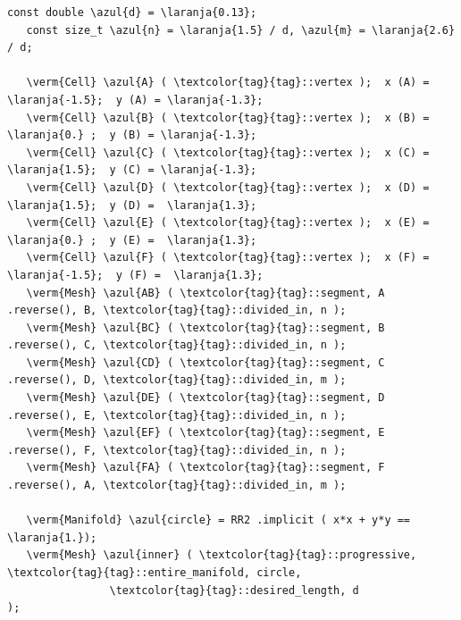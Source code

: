 \begin{Verbatim}[commandchars=\\\{\},formatcom=\small\tt,frame=single,
   label=parag-\ref{\numb section 7.\numb parag 22}.cpp,rulecolor=\color{moldura},
   baselinestretch=0.94,framesep=2mm                                             ]
   const double \azul{d} = \laranja{0.13};
   const size_t \azul{n} = \laranja{1.5} / d, \azul{m} = \laranja{2.6} / d;

   \verm{Cell} \azul{A} ( \textcolor{tag}{tag}::vertex );  x (A) = \laranja{-1.5};  y (A) = \laranja{-1.3};
   \verm{Cell} \azul{B} ( \textcolor{tag}{tag}::vertex );  x (B) =  \laranja{0.} ;  y (B) = \laranja{-1.3};
   \verm{Cell} \azul{C} ( \textcolor{tag}{tag}::vertex );  x (C) =  \laranja{1.5};  y (C) = \laranja{-1.3};
   \verm{Cell} \azul{D} ( \textcolor{tag}{tag}::vertex );  x (D) =  \laranja{1.5};  y (D) =  \laranja{1.3};
   \verm{Cell} \azul{E} ( \textcolor{tag}{tag}::vertex );  x (E) =  \laranja{0.} ;  y (E) =  \laranja{1.3};
   \verm{Cell} \azul{F} ( \textcolor{tag}{tag}::vertex );  x (F) = \laranja{-1.5};  y (F) =  \laranja{1.3};
   \verm{Mesh} \azul{AB} ( \textcolor{tag}{tag}::segment, A .reverse(), B, \textcolor{tag}{tag}::divided_in, n );
   \verm{Mesh} \azul{BC} ( \textcolor{tag}{tag}::segment, B .reverse(), C, \textcolor{tag}{tag}::divided_in, n );
   \verm{Mesh} \azul{CD} ( \textcolor{tag}{tag}::segment, C .reverse(), D, \textcolor{tag}{tag}::divided_in, m );
   \verm{Mesh} \azul{DE} ( \textcolor{tag}{tag}::segment, D .reverse(), E, \textcolor{tag}{tag}::divided_in, n );
   \verm{Mesh} \azul{EF} ( \textcolor{tag}{tag}::segment, E .reverse(), F, \textcolor{tag}{tag}::divided_in, n );
   \verm{Mesh} \azul{FA} ( \textcolor{tag}{tag}::segment, F .reverse(), A, \textcolor{tag}{tag}::divided_in, m );

   \verm{Manifold} \azul{circle} = RR2 .implicit ( x*x + y*y == \laranja{1.});
   \verm{Mesh} \azul{inner} ( \textcolor{tag}{tag}::progressive, \textcolor{tag}{tag}::entire_manifold, circle,
                \textcolor{tag}{tag}::desired_length, d                         );
\end{Verbatim}

